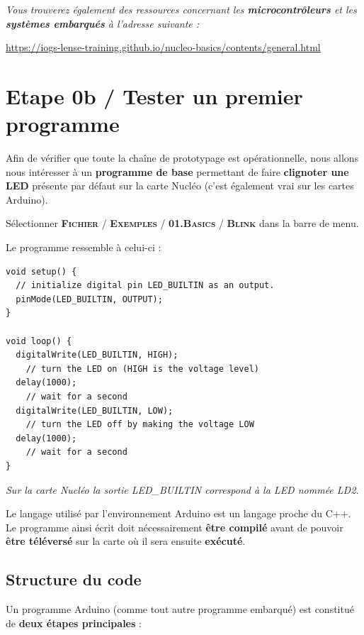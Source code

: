 \documentclass[a4paper,11pt,titlepage]{article} %
\begin{document}
\bigskip 

\textit{Vous trouverez également des ressources concernant les \textbf{microcontrôleurs} et les \textbf{systèmes embarqués} à l'adresse suivante :}

\href{https://iogs-lense-training.github.io/nucleo-basics/contents/general.html}{https://iogs-lense-training.github.io/nucleo-basics/contents/general.html}


\cleardoublepage
\section{Etape 0b / Tester un premier programme}

Afin de vérifier que toute la chaîne de prototypage est opérationnelle, nous allons nous intéresser à un \textbf{programme de base} permettant de faire \textbf{clignoter une LED} présente par défaut sur la carte Nucléo (c'est également vrai sur les cartes Arduino).

Sélectionner \textsc{\textbf{Fichier} / \textbf{Exemples} / \textbf{01.Basics} / \textbf{Blink}} dans la barre de menu.

Le programme ressemble à celui-ci :

\begin{lstlisting}
void setup() {
  // initialize digital pin LED_BUILTIN as an output.
  pinMode(LED_BUILTIN, OUTPUT);
}

void loop() {
  digitalWrite(LED_BUILTIN, HIGH);  
  	// turn the LED on (HIGH is the voltage level)
  delay(1000);                      
  	// wait for a second
  digitalWrite(LED_BUILTIN, LOW);   
  	// turn the LED off by making the voltage LOW
  delay(1000);                      
  	// wait for a second
}
\end{lstlisting}

\textit{Sur la carte Nucléo la sortie LED\_BUILTIN correspond à la LED nommée LD2.}

Le langage utilisé par l'environnement Arduino est un langage proche du C++. Le programme ainsi écrit doit nécessairement \textbf{être compilé} avant de pouvoir \textbf{être téléversé} sur la carte où il sera ensuite \textbf{exécuté}.

\subsection{Structure du code}

Un programme Arduino (comme tout autre programme embarqué) est constitué de \textbf{deux étapes principales} : 
\end{document}
